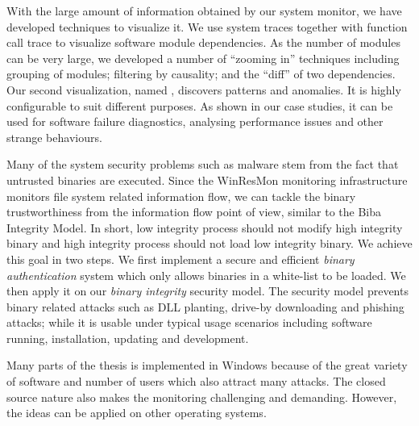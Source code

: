 With the large amount of information obtained by our system monitor,
we have developed techniques to visualize it.
We use system traces together with function call trace to visualize
software module dependencies.
As the number of modules can be very large,
we developed a number of ``zooming in'' techniques including
grouping of modules; filtering by causality;
and the ``diff'' of two dependencies.
Our second visualization, named , discovers patterns and anomalies.
It is highly configurable to suit different purposes.
As shown in our case studies,
it can be used for software failure diagnostics,
analysing performance issues and other strange behaviours.

Many of the system security problems such as malware stem from the fact that
untrusted binaries are executed.
Since the WinResMon monitoring infrastructure monitors file system related information flow,
we can tackle the binary trustworthiness from the information
flow point of view, similar to the Biba Integrity Model.
In short, low integrity process should not modify high integrity binary and
high integrity process should not load low integrity binary.
We achieve this goal in two steps.
We first implement a secure and efficient {\em binary authentication} system
which only allows binaries in a white-list to be loaded.
We then apply it on our {\em binary integrity} security model.
The security model prevents binary related attacks such as DLL planting,
drive-by downloading and phishing attacks;
while it is usable under typical usage scenarios including
software running, installation, updating and development.

Many parts of the thesis is implemented in Windows because of the great
variety of software and number of users which also attract many attacks.
The closed source nature also makes the monitoring challenging and
demanding.
However, the ideas can be applied on other operating systems.
